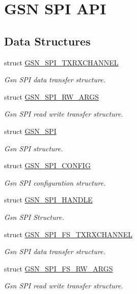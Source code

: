 \hypertarget{a00655}{
\section{GSN SPI API}
\label{a00655}
}
\subsection*{Data Structures}
\begin{DoxyCompactItemize}
\item 
struct \hyperlink{a00241}{GSN\_\-SPI\_\-TXRXCHANNEL}
\begin{DoxyCompactList}\small\item\em Gsn SPI data transfer structure. \end{DoxyCompactList}\item 
struct \hyperlink{a00239}{GSN\_\-SPI\_\-RW\_\-ARGS}
\begin{DoxyCompactList}\small\item\em Gsn SPI read write transfer structure. \end{DoxyCompactList}\item 
struct \hyperlink{a00230}{GSN\_\-SPI}
\begin{DoxyCompactList}\small\item\em Gsn SPI structure. \end{DoxyCompactList}\item 
struct \hyperlink{a00231}{GSN\_\-SPI\_\-CONFIG}
\begin{DoxyCompactList}\small\item\em Gsn SPI configuration structure. \end{DoxyCompactList}\item 
struct \hyperlink{a00238}{GSN\_\-SPI\_\-HANDLE}
\begin{DoxyCompactList}\small\item\em Gsn SPI Structure. \end{DoxyCompactList}\item 
struct \hyperlink{a00237}{GSN\_\-SPI\_\-FS\_\-TXRXCHANNEL}
\begin{DoxyCompactList}\small\item\em Gsn SPI data transfer structure. \end{DoxyCompactList}\item 
struct \hyperlink{a00235}{GSN\_\-SPI\_\-FS\_\-RW\_\-ARGS}
\begin{DoxyCompactList}\small\item\em Gsn SPI read write transfer structure. \end{DoxyCompactList}\item 

\end{DoxyCompactItemize}
